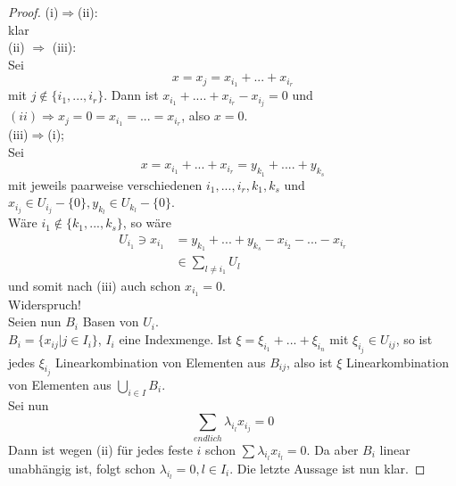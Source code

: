 \documentclass[12pt,a4paper]{article}
\theoremstyle{definition}
\theoremstyle{remark}
\begin{document}
	\begin{proof}
		(i)$ \Rightarrow $(ii): \\
		 klar \\
		(ii) $\Rightarrow$ (iii): \\
		Sei
		\begin{equation}
			x = x_j=x_{i_1}+...+x_{i_r}
		\end{equation}
		mit $j \notin \{ i_1,...,i_r \}$. Dann ist $x_{i_1}+....+x_{i_r}-x_{i_j}=0$ und $(ii) \Rightarrow x_j =0=x_{i_1}=...=x_{i_r}$, also $x=0$. \\
		(iii)$\Rightarrow$(i); \\
		Sei 
		\begin{equation}
			x = x_{i_1}+...+x_{i_r}= y_{k_1}+....+y_{k_s}
		\end{equation}
		mit jeweils paarweise verschiedenen $i_1,...,i_r,k_1,k_s$ und $x_{i_j} \in U_{i_j}-\{ 0\}, y_{k_l} \in U_{k_l}-\{0 \}$. \\
		Wäre $i_1 \notin \{ k_1,...,k_s \}$, so wäre
		\begin{equation}
			\begin{split}
				U_{i_1} \ni x_{i_1} &= y_{k_1}+...+y_{k_s}-x_{i_2}-...-x_{i_r} \\
				& \in \sum_{l \neq i_1} U_l
			\end{split}
		\end{equation}
		und somit nach (iii) auch schon $x_{i_1} =0$. \\
		Widerspruch!\\
		Seien nun $B_i$ Basen von $U_i$. \\
		$B_i = \{ x_{ij} | j \in I_i \}$, $I_i$ eine Indexmenge. Ist $\xi = \xi_{i_1}+...+\xi_{i_n}$ mit $\xi_{i_j} \in U_{ij}$, so ist jedes $\xi_{i_j}$ Linearkombination von Elementen aus $B_{ij}$, also ist $\xi$ Linearkombination von Elementen aus $\bigcup_{i \in I} B_i$. \\
		Sei nun
		\begin{equation}
			\sum\limits_{endlich} \lambda_{i_l}x_{i_j}=0
		\end{equation}
		Dann ist wegen (ii) für jedes feste $i$ schon $\sum \lambda_{i_l}x_{i_l}=0$. Da aber $B_i$ linear unabhängig ist, folgt schon $\lambda_{i_l}=0, l \in I_i$.
		Die letzte Aussage ist nun klar.
	\end{proof}
	
	\newpage	
	
\end{document}
